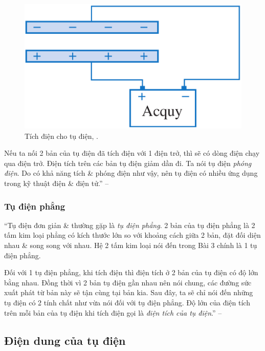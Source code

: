 \documentclass[oneside]{book}
\numberwithin{equation}{section}
\begin{document}
\begin{figure}[H]
	\centering
	\includegraphics[scale=0.15]{tich_dien_cho_tu_dien}
	\caption{Tích điện cho tụ điện, \cite[Hình 7.2, p. 32]{SGK_Vat_Ly_11_nang_cao}.}
	\label{fig:tich_dien_cho_tu_dien}
\end{figure}
Nếu ta nối 2 bản của tụ điện đã tích điện với 1 điện trở, thì sẽ có dòng điện chạy qua điện trở. Điện tích trên các bản tụ điện giảm dần đi. Ta nói tụ điện \textit{phóng điện}. Do có khả năng tích \& phóng điện như vậy, nên tụ điện có nhiều ứng dụng trong kỹ thuật điện \& điện tử.'' -- \cite[p. 32]{SGK_Vat_Ly_11_nang_cao}

\subsubsection{Tụ điện phẳng}
``Tụ điện đơn giản \& thường gặp là \textit{tụ điện phẳng}. 2 bản của tụ điện phẳng là 2 tấm kim loại phẳng có kích thước lớn so với khoảng cách giữa 2 bản, đặt đối diện nhau \& song song với nhau. Hệ 2 tấm kim loại nói đến trong Bài 3 chính là 1 tụ điện phẳng.

Đối với 1 tụ điện phẳng, khi tích điện thì điện tích ở 2 bản của tụ điện có độ lớn bằng nhau. Đồng thời vì 2 bản tụ điện gần nhau nên nói chung, các đường sức xuất phát từ bản này sẽ tận cùng tại bản kia. Sau đây, ta sẽ chỉ nói đến những tụ điện có 2 tính chất như vừa nói đối với tụ điện phẳng. Độ lớn của điện tích trên mỗi bản của tụ điện khi tích điện gọi là \textit{điện tích của tụ điện}.'' -- \cite[p. 32]{SGK_Vat_Ly_11_nang_cao}

\subsection{Điện dung của tụ điện}
\end{document}
